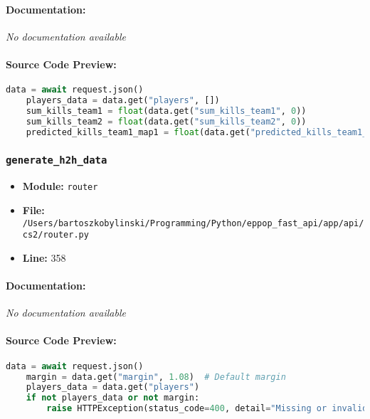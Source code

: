 \documentclass[11pt,a4paper]{article}
\begin{document}
\paragraph{Documentation:} \textit{No documentation available}

\paragraph{Source Code Preview:}
\begin{lstlisting}[language=Python]
    data = await request.json()
    players_data = data.get("players", [])
    sum_kills_team1 = float(data.get("sum_kills_team1", 0))
    sum_kills_team2 = float(data.get("sum_kills_team2", 0))
    predicted_kills_team1_map1 = float(data.get("predicted_kills_team1_map1", 0)) / 2
\end{lstlisting}

\vspace{1em}
\subsubsection{\texttt{generate\_h2h\_data}}

\begin{itemize}
    \item \textbf{Module:} \texttt{router}
    \item \textbf{File:} \texttt{/Users/bartoszkobylinski/Programming/Python/eppop\_fast\_api/app/api/cs2/router.py}
    \item \textbf{Line:} 358
\end{itemize}

\paragraph{Documentation:} \textit{No documentation available}

\paragraph{Source Code Preview:}
\begin{lstlisting}[language=Python]
    data = await request.json()
    margin = data.get("margin", 1.08)  # Default margin
    players_data = data.get("players")
    if not players_data or not margin:
        raise HTTPException(status_code=400, detail="Missing or invalid data in the request")
\end{lstlisting}

\vspace{1em}
\end{document}
